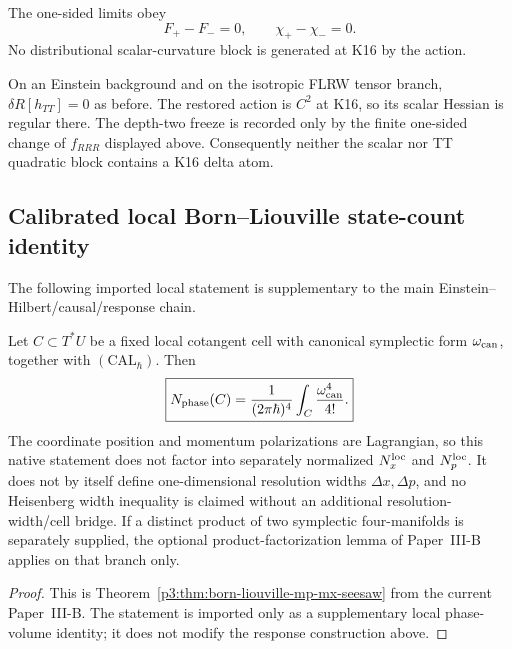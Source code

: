 \documentclass[11pt,a4paper]{article}
\begin{document}
\begin{corollary}
\label{p3e:cor:v189-k16-F-jump}
The one-sided limits obey
\[
 \boxed{F_+-F_-=0,\qquad \chi_+-\chi_-=0.}
\]
No distributional scalar-curvature block is generated at K16 by the action.
\end{corollary}

\begin{theorem}
\label{p3e:thm:v189-k16-tt-regularity}
On an Einstein background and on the isotropic FLRW tensor branch,
$\delta R[h_{TT}]=0$ as before.  The restored action is $C^2$ at K16, so its
scalar Hessian is regular there.  The depth-two freeze is recorded only by the
finite one-sided change of $f_{RRR}$ displayed above.  Consequently neither
the scalar nor TT quadratic block contains a K16 delta atom.
\end{theorem}

\subsection{Calibrated local Born--Liouville state-count identity}
\label{p3e:app:local-born-liouville}
The following imported local statement is supplementary to the main
Einstein--Hilbert/\allowbreak causal/\allowbreak response chain.

\begin{corollary}
\label{p3:cor:local-uncertainty-seesaw}
Let \(C\subset T^*U\) be a fixed local cotangent cell with canonical
symplectic form \(\omega_{\rm can}\), together with
\((\mathrm{CAL}_{\hbar})\).  Then
\[
 \boxed{
 N_{\rm phase}(C)
 =\frac{1}{(2\pi\hbar)^4}
  \int_C\frac{\omega_{\rm can}^{4}}{4!}.}
\]
The coordinate position and momentum polarizations are Lagrangian, so this
native statement does not factor into separately normalized
\(N_x^{\rm loc}\) and \(N_p^{\rm loc}\).  It does not by itself define
one-dimensional resolution widths \(\Delta x,\Delta p\), and no Heisenberg
width inequality is claimed without an additional resolution-width/cell
bridge.  If a distinct product of two symplectic four-manifolds is separately
supplied, the optional product-factorization lemma of Paper~III-B applies on
that branch only.
\end{corollary}

\begin{proof}
This is Theorem~\ref{p3:thm:born-liouville-mp-mx-seesaw} from the current
Paper~III-B.  The statement is imported only as a supplementary local
phase-volume identity; it does not modify the response construction above.
\end{proof}
\end{document}
